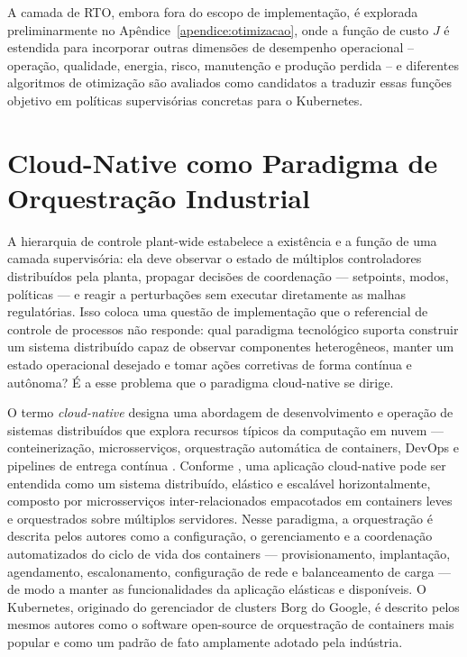 A camada de RTO, embora fora do escopo de implementação, é explorada preliminarmente no
Apêndice~\ref{apendice:otimizacao}, onde a função de custo $J$ é estendida para incorporar outras
dimensões de desempenho operacional -- operação, qualidade, energia, risco, manutenção e produção
perdida -- e diferentes algoritmos de otimização são avaliados como candidatos a traduzir essas
funções objetivo em políticas supervisórias concretas para o Kubernetes.


\section{Cloud-Native como Paradigma de Orquestração Industrial}
\label{sec:cloudnative}

A hierarquia de controle plant-wide estabelece a existência e a função de uma camada supervisória: ela deve observar o estado de múltiplos controladores distribuídos pela planta, propagar decisões de coordenação --- setpoints, modos, políticas --- e reagir a perturbações sem executar diretamente as malhas regulatórias. Isso coloca uma questão de implementação que o referencial de controle de processos não responde: qual paradigma tecnológico suporta construir um sistema distribuído capaz de observar componentes heterogêneos, manter um estado operacional desejado e tomar ações corretivas de forma contínua e autônoma? É a esse problema que o paradigma cloud-native se dirige.

O termo \textit{cloud-native} designa uma abordagem de desenvolvimento e operação de sistemas distribuídos que explora recursos típicos da computação em nuvem --- conteinerização, microsserviços, orquestração automática de containers, DevOps e pipelines de entrega contínua \cite{Shuiguang2023}. Conforme , uma aplicação cloud-native pode ser entendida como um sistema distribuído, elástico e escalável horizontalmente, composto por microsserviços inter-relacionados empacotados em containers leves e orquestrados sobre múltiplos servidores. Nesse paradigma, a orquestração é descrita pelos autores como a configuração, o gerenciamento e a coordenação automatizados do ciclo de vida dos containers --- provisionamento, implantação, agendamento, escalonamento, configuração de rede e balanceamento de carga --- de modo a manter as funcionalidades da aplicação elásticas e disponíveis. O Kubernetes, originado do gerenciador de clusters Borg do Google, é descrito pelos mesmos autores como o software open-source de orquestração de containers mais popular e como um padrão de fato amplamente adotado pela indústria.

